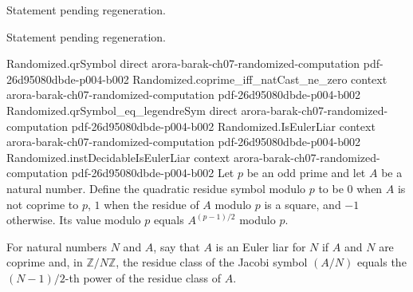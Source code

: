 \begin{theorem}
\label{Randomized.qrSymbol_eq_legendreSym}
\leanok
{}
Statement pending regeneration.
\end{theorem}

\begin{theorem}
\label{Randomized.jacobiSym_eq_prod_qrSymbol}
\leanok
{}
Statement pending regeneration.
\end{theorem}

\begin{theorem}
\label{Randomized.qrSymbol_eq_pow}
\leanok
{}
\proofstep
  {Randomized.qrSymbol}
  {direct}
  {arora-barak-ch07-randomized-computation}
  {pdf-26d95080dbde-p004-b002}
\proofstep
  {Randomized.coprime_iff_natCast_ne_zero}
  {context}
  {arora-barak-ch07-randomized-computation}
  {pdf-26d95080dbde-p004-b002}
\proofstep
  {Randomized.qrSymbol_eq_legendreSym}
  {direct}
  {arora-barak-ch07-randomized-computation}
  {pdf-26d95080dbde-p004-b002}
\proofstep
  {Randomized.IsEulerLiar}
  {context}
  {arora-barak-ch07-randomized-computation}
  {pdf-26d95080dbde-p004-b002}
\proofstep
  {Randomized.instDecidableIsEulerLiar}
  {context}
  {arora-barak-ch07-randomized-computation}
  {pdf-26d95080dbde-p004-b002}
Let $p$ be an odd prime and let $A$ be a natural number. Define the quadratic residue
symbol modulo $p$ to be $0$ when $A$ is not coprime to $p$, $1$ when the residue of $A$
modulo $p$ is a square, and $-1$ otherwise. Its value modulo $p$ equals $A^{(p-1)/2}$
modulo $p$.
\end{theorem}

\begin{definition}
\label{Randomized.IsEulerLiar}
\leanok
For natural numbers $N$ and $A$, say that $A$ is an Euler liar for $N$ if $A$ and $N$
are coprime and, in $\mathbb{Z}/N\mathbb{Z}$, the residue class of the Jacobi symbol
$(A/N)$ equals the $(N-1)/2$-th power of the residue class of $A$.
\end{definition}

